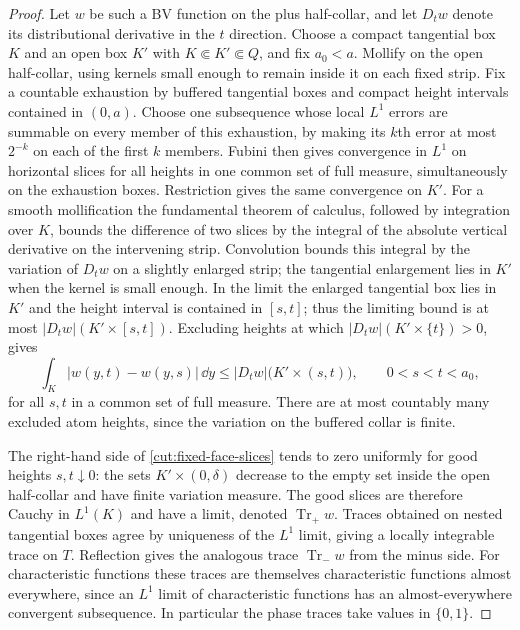 \begin{proof}
Let $w$ be such a BV function on the plus half-collar, and let $D_t w$
denote its distributional derivative in the $t$ direction.
Choose a compact tangential box $K$ and an open box $K'$ with
$K\Subset K'\Subset Q$, and fix $a_0<a$.
Mollify on the open half-collar, using kernels small enough to remain
inside it on each fixed strip.  Fix a countable exhaustion by buffered
tangential boxes and compact height intervals contained in $(0,a)$.
Choose one subsequence whose local $L^1$ errors are summable on every
member of this exhaustion, by making its $k$th error at most $2^{-k}$
on each of the first $k$ members.  Fubini then gives convergence in
$L^1$ on horizontal slices for all heights in one common set of full
measure, simultaneously on the exhaustion boxes.  Restriction gives
the same convergence on $K'$.
For a smooth mollification the fundamental
theorem of calculus, followed by integration over $K$, bounds the
difference of two slices by the integral of the absolute vertical
derivative on the intervening strip.  Convolution bounds this integral
by the variation of $D_t w$ on a slightly enlarged strip; the
tangential enlargement lies in $K'$ when the kernel is small enough.
In the limit the enlarged tangential box lies in $K'$ and the height
interval is contained in $[s,t]$; thus the limiting bound is at most
$|D_t w|(K'\times[s,t])$.
Excluding heights at which
$|D_t w|(K'\times\{t\})>0$, gives
\begin{equation}\label{cut:fixed-face-slices}
 \int_K |w(y,t)-w(y,s)|\,\dd y
 \le |D_t w|\bigl(K'\times(s,t)\bigr),
 \qquad 0<s<t<a_0,
\end{equation}
for all $s,t$ in a common set of full measure.
There are at most countably many excluded atom heights, since the
variation on the buffered collar is finite.

The right-hand side of \eqref{cut:fixed-face-slices} tends to zero
uniformly for good heights $s,t\downarrow0$: the sets
$K'\times(0,\delta)$ decrease to the empty set inside the open
half-collar and have finite variation measure.  The good slices are
therefore Cauchy in $L^1(K)$ and have a limit, denoted
$\operatorname{Tr}_+w$.
Traces obtained on nested tangential boxes agree by uniqueness of the
$L^1$ limit, giving a locally integrable trace on $T$.
Reflection gives the analogous trace $\operatorname{Tr}_-w$ from the
minus side.  For characteristic functions these traces are themselves
characteristic functions almost everywhere, since an $L^1$ limit of
characteristic functions has an almost-everywhere convergent
subsequence.  In particular the phase traces take values in $\{0,1\}$.


\end{proof}
